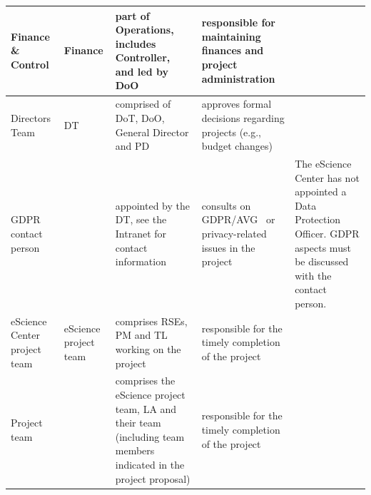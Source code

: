 \begin{tabularx}{\linewidth}{p{}|p{}|p{}|p{}|p{}}
Finance \& Control                                 & Finance               & part of Operations, includes Controller, and led by DoO                                                           & responsible for maintaining finances and project administration                                                                                                                                                                &                                                                   \\\hline
Directors Team                                     & DT                    & comprised of DoT, DoO, General Director and PD                                                                    & approves formal decisions regarding projects (e.g., budget changes)                                                                                                                                                                    &                                                                                                                                      \\\hline
GDPR contact person                                &                       & appointed by the DT, see the Intranet for contact information                                                     & consults on GDPR/AVG~\cite{GDPR,DCCPO_AVG_privacy,unl2025} or privacy-related issues in the project                                                                                                                                                                             & The eScience Center has not appointed a Data Protection Officer. GDPR aspects must be discussed with the contact person.             \\\hline
eScience Center project team                       & eScience project team & comprises RSEs, PM and TL working on the project                                                                  & responsible for the timely completion of the project                                                                                                                                                                                   &                                                                                                                                      \\\hline
Project team                                       &                       & comprises the eScience project team, LA and their team (including team members indicated in the project proposal) & responsible for the timely completion of the project                                                                                                                                                                                   &                                                                                                                                      \\\hline

\end{tabularx}

